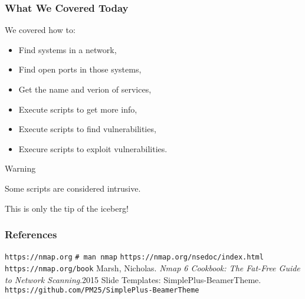 \documentclass[aspectratio=169,xcolor=dvipsnames]{beamer}
\begin{document}
\begin{frame}[fragile]
    \frametitle{What We Covered Today}
    
    We covered how to:

    \begin{itemize}
        \item Find systems in a network,
        \item Find open ports in those systems,
        \item Get the name and verion of services,
        \item Execute scripts to get more info,
        \item Execute scripts to find vulnerabilities,
        \item Execure scripts to exploit vulnerabilities.
    \end{itemize}

    \pause

    \begin{alertblock}{Warning}
        \begin{center}
            Some scripts are considered intrusive.
        \end{center}
    \end{alertblock}

    \pause

    \begin{exampleblock}{}
        \begin{center}
            This is only the tip of the iceberg!
        \end{center}
    \end{exampleblock}

\end{frame}

\begin{frame}

    \centering
    \Huge\textbf{}

\end{frame}

\begin{frame}
   \frametitle{References}
   
    \begin{thebibliography}{9}        
            \texttt{https://nmap.org}
            \texttt{\# man nmap}
            \texttt{https://nmap.org/nsedoc/index.html}
            \texttt{https://nmap.org/book}
            Marsh, Nicholas. \textit{Nmap 6 Cookbook: The Fat-Free Guide to Network Scanning}.2015
            Slide Templates: SimplePlus-BeamerTheme. \texttt{https://github.com/PM25/SimplePlus-BeamerTheme}
    \end{thebibliography}

\end{frame}
\end{document}
